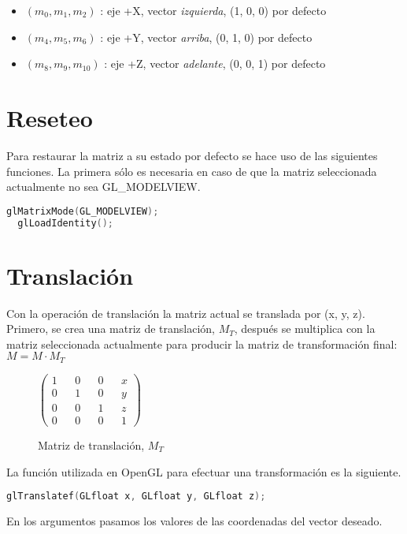 \begin{itemize}
\item{\((m_0, m_1, m_2)\) : eje +X, vector \textit{izquierda}, (1, 0, 0) por defecto}
\item{\((m_4, m_5, m_6)\) : eje +Y, vector \textit{arriba}, (0, 1, 0) por defecto}
\item{\((m_8, m_9, m_{10})\) : eje +Z, vector \textit{adelante}, (0, 0, 1) por defecto}
\end{itemize}

\section{Reseteo}
Para restaurar la matriz a su estado por defecto se hace uso de las siguientes funciones. La primera sólo es necesaria en caso de que la matriz seleccionada actualmente no sea GL\_MODELVIEW.
\begin{lstlisting}[language=C]
  glMatrixMode(GL_MODELVIEW);
  glLoadIdentity();
\end{lstlisting}

\section{Translación}
Con la operación de translación la matriz actual se translada por (x, y, z). Primero, se crea una matriz de translación, $M_T$, después se multiplica con la matriz seleccionada actualmente para producir la matriz de transformación final: $M = M \cdot M_T$
\begin{figure} [ht]
  \centering
  \(
  \begin{pmatrix}
    1 && 0 && 0 && x\\
    0 && 1 && 0 && y\\
    0 && 0 && 1 && z\\
    0 && 0 && 0 && 1
  \end{pmatrix}
  \)
  \caption{Matriz de translación, $M_T$}
\end{figure}

La función utilizada en OpenGL para efectuar una transformación es la siguiente.
\begin{lstlisting}[language=C]
  glTranslatef(GLfloat x, GLfloat y, GLfloat z);
\end{lstlisting}
En los argumentos pasamos los valores de las coordenadas del vector deseado.

